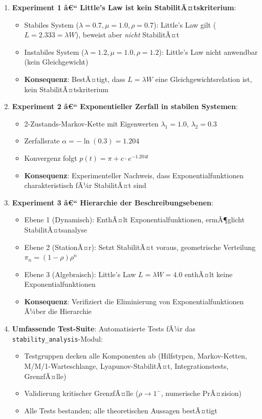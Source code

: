 ﻿\documentclass[a4paper,12pt]{report}
\theoremstyle{definition}
\begin{document}
\begin{enumerate}
	\item[-] \textbf{Experiment 1 â€“ Little's Law ist kein StabilitÃ¤tskriterium}:
	\begin{itemize}
		\item[-] Stabiles System ($\lambda = 0.7, \mu = 1.0, \rho = 0.7$): Little's Law gilt ($L = 2.333 = \lambda W$), beweist aber \textit{nicht} StabilitÃ¤t
		\item[-] Instabiles System ($\lambda = 1.2, \mu = 1.0, \rho = 1.2$): Little's Law nicht anwendbar (kein Gleichgewicht)
		\item[-] \textbf{Konsequenz}: BestÃ¤tigt, dass $L = \lambda W$ eine Gleichgewichtsrelation ist, kein StabilitÃ¤tskriterium
	\end{itemize}
	
	\item[-] \textbf{Experiment 2 â€“ Exponentieller Zerfall in stabilen Systemen}:
	\begin{itemize}
		\item[-] 2-Zustands-Markov-Kette mit Eigenwerten $\lambda_1 = 1.0$, $\lambda_2 = 0.3$
		\item[-] Zerfallsrate $\alpha = -\ln(0.3) = 1.204$
		\item[-] Konvergenz folgt $p(t) = \pi + c \cdot e^{-1.204t}$
		\item[-] \textbf{Konsequenz}: Experimenteller Nachweis, dass Exponentialfunktionen charakteristisch fÃ¼r StabilitÃ¤t sind
	\end{itemize}
	
	\item[-] \textbf{Experiment 3 â€“ Hierarchie der Beschreibungsebenen}:
	\begin{itemize}
		\item[-] Ebene 1 (Dynamisch): EnthÃ¤lt Exponentialfunktionen, ermÃ¶glicht StabilitÃ¤tsanalyse
		\item[-] Ebene 2 (StationÃ¤r): Setzt StabilitÃ¤t voraus, geometrische Verteilung $\pi_n = (1-\rho)\rho^n$
		\item[-] Ebene 3 (Algebraisch): Little's Law $L = \lambda W = 4.0$ enthÃ¤lt keine Exponentialfunktionen
		\item[-] \textbf{Konsequenz}: Verifiziert die Eliminierung von Exponentialfunktionen Ã¼ber die Hierarchie
	\end{itemize}
	
	\item[-] \textbf{Umfassende Test-Suite}: Automatisierte Tests fÃ¼r das
	\texttt{stability\_analysis}-Modul:
	\begin{itemize}
		\item[-] Testgruppen decken alle Komponenten ab (Hilfstypen,
		Markov-Ketten, M/M/1-Warteschlange, Lyapunov-StabilitÃ¤t,
		Integrationstests, GrenzfÃ¤lle)
		\item[-] Validierung kritischer GrenzfÃ¤lle ($\rho \to 1^-$,
		numerische PrÃ¤zision)
		\item[-] Alle Tests bestanden; alle theoretischen Aussagen bestÃ¤tigt
	\end{itemize}
\end{enumerate}
\end{document}
